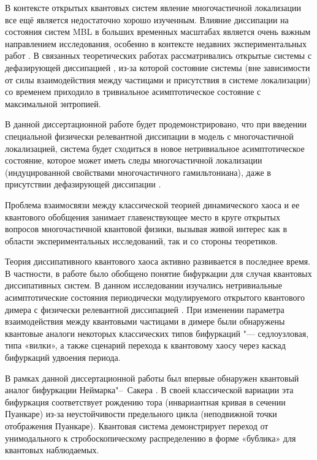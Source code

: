В контексте открытых квантовых систем явление многочастичной локализации все ещё является недостаточно хорошо изученным. Влияние диссипации на состояния систем  MBL в больших временных масштабах является очень важным направлением исследования, особенно в контексте недавних экспериментальных работ \autocite{Schreiber2015, Choi2016, Bordia2017, Smith2016}. В связанных теоретических работах \autocite{Levi2016, Fischer2016, Medvedyeva2016} рассматривались открытые системы с дефазирующей диссипацией \autocite{Poletti2013}, из-за которой состояние системы (вне зависимости от силы взаимодействия между частицами и присутствия в системе локализации) со временем приходило в тривиальное асимптотическое состояние с максимальной энтропией.

В данной диссертационной работе будет продемонстрировано, что при введении специальной физически релевантной диссипации \autocite{Diehl2008} в модель с многочастичной локализацией, система будет сходиться в новое нетривиальное асимптотическое состояние, которое может иметь следы многочастичной локализации (индуцированной свойствами многочастичного гамильтониана), даже в присутствии дефазирующей диссипации \cite{Vakulchyk2018}.  
 
Проблема взаимосвязи между классической теорией динамического хаоса и ее квантового обобщения занимает главенствующее место в круге открытых вопросов многочастичной квантовой физики, вызывая живой интерес как в области экспериментальных исследований, так и со стороны теоретиков. 

Теория диссипативного квантового хаоса активно развивается в последнее время.
В частности, в работе \autocite{Ivanchenko2017} было обобщено понятие бифуркации для случая квантовых диссипативных систем. 
В данном исследовании изучались нетривиальные асимптотические состояния периодически модулируемого открытого квантового димера с физически релевантной диссипацией \autocite{Diehl2008}.
При изменении параметра взаимодействия между квантовыми частицами в димере были обнаружены квантовые аналоги некоторых классических типов бифуркаций "--- седлоузловая, типа «вилки», а также сценарий перехода к квантовому хаосу через каскад бифуркаций удвоения периода.
 
В рамках данной диссертационной работы был впервые обнаружен квантовый аналог бифуркации Неймарка"--~Сакера \cite{Yusipov2019_1}. В своей классической вариации эта бифуркация соответствует рождению тора (инвариантная кривая в сечении Пуанкаре) из-за неустойчивости предельного цикла (неподвижной точки отображения Пуанкаре). Квантовая система демонстрирует переход от унимодального к стробоскопическому распределению в форме «бублика» для квантовых наблюдаемых.

